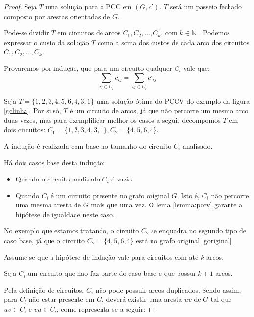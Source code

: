         \begin{proof} 
            Seja $T$ uma solução para o PCC em $(G, c')$. 
            $T$ será um passeio fechado composto por arestas orientadas de $G$.

            Pode-se dividir $T$ em circuitos de arcos $C_1, C_2, \dots, C_k$, com $k \in \mathbb{N}$ . %
            Podemos expressar o custo da solução $T$ como a soma dos custos de cada arco dos circuitos $C_1, C_2, \dots, C_k$. 

            Provaremos por indução, que para um circuito qualquer $C_i$ vale que:
            \[
                \sum_{ij \in C_i} c_{ij} = \sum_{ij \in C_i} c'_{ij}
            \]

            Seja $T = \{1, 2, 3, 4, 5, 6, 4, 3, 1\}$ uma solução ótima do PCCV do exemplo da figura \ref{gclinha}.
            Por si só, $T$ é um circuito de arcos, já que não percorre um mesmo arco duas vezes, mas para exemplificar melhor os casos a seguir decompomos $T$ em dois circuitos: $C_1 = \{1, 2, 3, 4, 3, 1\}, C_2 = \{4, 5, 6, 4\}$.

            A indução é realizada com base no tamanho do circuito $C_i$ analisado.

            Há dois casos base desta indução:

            \begin{itemize}
                \item Quando o circuito analisado $C_i$ é vazio.
                \item Quando $C_i$ é um circuito presente no grafo original $G$. 
                    Isto é, $C_i$ não percorre uma mesma aresta de $G$ mais que uma vez.
                    O lema \ref{lemma:pccv} garante a hipótese de igualdade neste caso.
            \end{itemize}

            No exemplo que estamos tratando, o circuito $C_2$ se enquadra no segundo tipo de caso base, já que o circuito $C_2 = \{4, 5, 6, 4\}$ está no grafo original \ref{goriginal}

            Assume-se que a hipótese de indução vale para circuitos com até $k$ arcos.

            Seja $C_i$ um circuito que não faz parte do caso base e que possui $k+1$ arcos.

            Pela definição de circuitos, $C_i$ não pode possuir arcos duplicados.  %
            Sendo assim, para $C_i$ não estar presente em $G$, deverá existir uma aresta $uv$ de $G$ tal que $uv \in C_i$ e $vu \in C_i$, como representa-se a seguir:


\end{proof}
